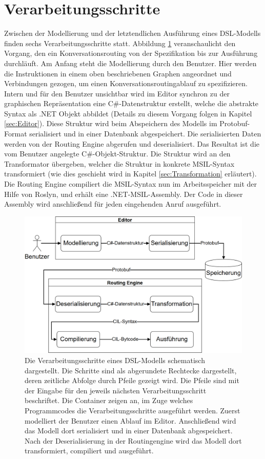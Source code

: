 \section{Verarbeitungsschritte}
\label{sec:Verarbeitungsschritte}
Zwischen der Modellierung und der letztendlichen Ausführung eines DSL-Modells finden sechs Verarbeitungsschritte statt. Abbildung \ref{fig:Verarbeitungsschritte} veranschaulicht den Vorgang, den ein Konversationsrouting von der Spezifikation bis zur Ausführung durchläuft. Am Anfang steht die Modellierung durch den Benutzer. Hier werden die Instruktionen in einem oben beschriebenen Graphen angeordnet und Verbindungen gezogen, um einen Konversationsroutingablauf zu spezifizieren. Intern und für den Benutzer unsichtbar wird im Editor synchron zu der graphischen Repräsentation eine C\#-Datenstruktur erstellt, welche die abstrakte Syntax als .NET Objekt abbildet (Details zu diesem Vorgang folgen in Kapitel \ref{sec:Editor}). Diese Struktur wird beim Abspeichern des Modells im Protobuf-Format serialisiert und in einer Datenbank abgespeichert. Die serialisierten Daten werden von der Routing Engine abgerufen und deserialisiert. Das Resultat ist die vom Benutzer angelegte C\#-Objekt-Struktur. Die Struktur wird an den Transformator übergeben, welcher die Struktur in konkrete MSIL-Syntax transformiert (wie dies geschieht wird in Kapitel \ref{sec:Transformation} erläutert). Die Routing Engine compiliert die MSIL-Syntax nun im Arbeitsspeicher mit der Hilfe von Roslyn, und erhält eine .NET-MSIL-Assembly. Der Code in dieser Assembly wird anschließend für jeden eingehenden Anruf ausgeführt. 

\begin{figure} %
	\centering
		\includegraphics[width=\textwidth]{img/Verarbeitungsschritte.png}
	\caption[Verarbeitungsschritte eines DSL-Modells]{Die Verarbeitungsschritte eines DSL-Modells schematisch dargestellt. Die Schritte sind als abgerundete Rechtecke dargestellt, deren zeitliche Abfolge durch Pfeile gezeigt wird. Die Pfeile sind mit der Eingabe für den jeweils nächsten Verarbeitungsschritt beschriftet. Die Container zeigen an, im Zuge welches Programmcodes die Verarbeitungsschritte ausgeführt werden. Zuerst modelliert der Benutzer einen Ablauf im Editor. Anschließend wird das Modell dort serialisiert und in einer Datenbank abgespeichert. Nach der Deserialisierung in der Routingengine wird das Modell dort transformiert, compiliert und ausgeführt.}
	\label{fig:Verarbeitungsschritte}
\end{figure}